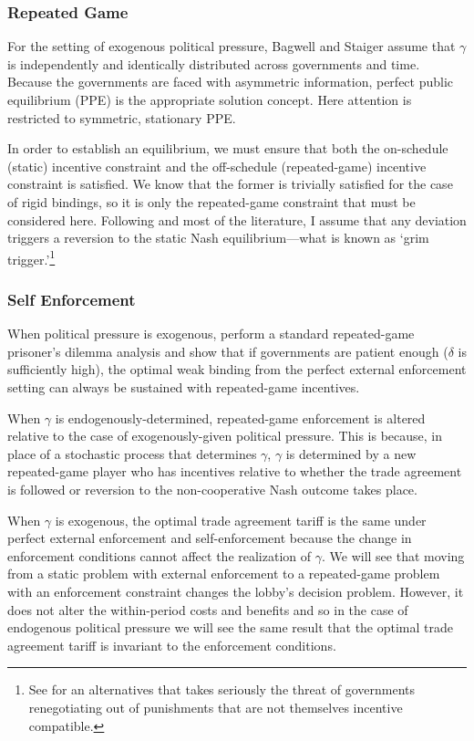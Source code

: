 \documentclass[12pt]{article}
\newcommand{\ga}{\gamma}
\newcommand{\de}{\delta}
\begin{document}
\subsubsection{Repeated Game}
For the setting of exogenous political pressure, Bagwell and Staiger assume that $\ga$ is independently and identically distributed across governments and time. Because the governments are faced with asymmetric information, perfect public equilibrium (PPE) is the appropriate solution concept. Here attention is restricted to symmetric, stationary PPE.
	
In order to establish an equilibrium, we must ensure that both the on-schedule (static) incentive constraint and the off-schedule (repeated-game) incentive constraint is satisfied. We know that the former is trivially satisfied for the case of rigid bindings, so it is only the repeated-game constraint that must be considered here. Following \Textcite{bs2005} and most of the literature, I assume that any deviation triggers a reversion to the static Nash equilibrium---what is known as `grim trigger.'\footnote{See \Textcite{krw} for an alternatives that takes seriously the threat of governments renegotiating out of punishments that are not themselves incentive compatible.}
	
\subsubsection{Self Enforcement}
\label{sec:selfweak}
When political pressure is exogenous, \Textcite{bs2005} perform a standard repeated-game prisoner's dilemma analysis and show that if governments are patient enough ($\de$ is sufficiently high), the optimal weak binding from the perfect external enforcement setting can always be sustained with repeated-game incentives.

When $\ga$ is endogenously-determined, repeated-game enforcement is altered relative to the case of exogenously-given political pressure. This is because, in place of a stochastic process that determines $\ga$, $\ga$ is determined by a new repeated-game player who has incentives relative to whether the trade agreement is followed or reversion to the non-cooperative Nash outcome takes place.

When $\ga$ is exogenous, the optimal trade agreement tariff is the same under perfect external enforcement and self-enforcement because the change in enforcement conditions cannot affect the realization of $\ga$. We will see that moving from a static problem with external enforcement to a repeated-game problem with an enforcement constraint changes the lobby's decision problem. However, it does not alter the within-period costs and benefits and so in the case of endogenous political pressure we will see the same result that the optimal trade agreement tariff is invariant to the enforcement conditions.
\end{document}
